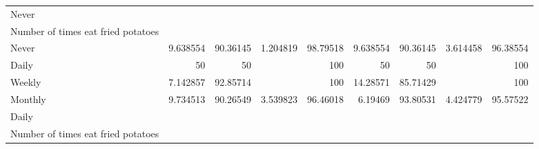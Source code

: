 \documentclass{article}
\begin{document}
\begin{tabular}{lllllllll}
\multicolumn{1}{l}{\hspace{5em}Never} &
  \multicolumn{1}{|r}{} &
  \multicolumn{1}{r}{} &
  \multicolumn{1}{r}{} &
  \multicolumn{1}{r}{} &
  \multicolumn{1}{r}{} &
  \multicolumn{1}{r}{} &
  \multicolumn{1}{r}{} &
  \multicolumn{1}{r}{} \\
\multicolumn{1}{l}{\hspace{6em}Number of times eat fried potatoes} &
  \multicolumn{1}{|r}{} &
  \multicolumn{1}{r}{} &
  \multicolumn{1}{r}{} &
  \multicolumn{1}{r}{} &
  \multicolumn{1}{r}{} &
  \multicolumn{1}{r}{} &
  \multicolumn{1}{r}{} &
  \multicolumn{1}{r}{} \\
\multicolumn{1}{l}{\hspace{7em}Never} &
  \multicolumn{1}{|r}{9.638554} &
  \multicolumn{1}{r}{90.36145} &
  \multicolumn{1}{r}{1.204819} &
  \multicolumn{1}{r}{98.79518} &
  \multicolumn{1}{r}{9.638554} &
  \multicolumn{1}{r}{90.36145} &
  \multicolumn{1}{r}{3.614458} &
  \multicolumn{1}{r}{96.38554} \\
\multicolumn{1}{l}{\hspace{7em}Daily} &
  \multicolumn{1}{|r}{50} &
  \multicolumn{1}{r}{50} &
  \multicolumn{1}{r}{} &
  \multicolumn{1}{r}{100} &
  \multicolumn{1}{r}{50} &
  \multicolumn{1}{r}{50} &
  \multicolumn{1}{r}{} &
  \multicolumn{1}{r}{100} \\
\multicolumn{1}{l}{\hspace{7em}Weekly} &
  \multicolumn{1}{|r}{7.142857} &
  \multicolumn{1}{r}{92.85714} &
  \multicolumn{1}{r}{} &
  \multicolumn{1}{r}{100} &
  \multicolumn{1}{r}{14.28571} &
  \multicolumn{1}{r}{85.71429} &
  \multicolumn{1}{r}{} &
  \multicolumn{1}{r}{100} \\
\multicolumn{1}{l}{\hspace{7em}Monthly} &
  \multicolumn{1}{|r}{9.734513} &
  \multicolumn{1}{r}{90.26549} &
  \multicolumn{1}{r}{3.539823} &
  \multicolumn{1}{r}{96.46018} &
  \multicolumn{1}{r}{6.19469} &
  \multicolumn{1}{r}{93.80531} &
  \multicolumn{1}{r}{4.424779} &
  \multicolumn{1}{r}{95.57522} \\
\multicolumn{1}{l}{\hspace{5em}Daily} &
  \multicolumn{1}{|r}{} &
  \multicolumn{1}{r}{} &
  \multicolumn{1}{r}{} &
  \multicolumn{1}{r}{} &
  \multicolumn{1}{r}{} &
  \multicolumn{1}{r}{} &
  \multicolumn{1}{r}{} &
  \multicolumn{1}{r}{} \\
\multicolumn{1}{l}{\hspace{6em}Number of times eat fried potatoes} &
  \multicolumn{1}{|r}{} &

\end{tabular}
\end{document}
